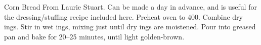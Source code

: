 \begin{recipe}{Corn Bread}{}{}
\freeform From Laurie Stuart.  Can be made a day in advance, and is useful for the dressing/stuffing recipe included here.
\newstep Preheat oven to 400\0.
Combine dry ings.
Stir in wet ings, mixing just until dry ings are moistened.  Pour into greased pan and bake for 20--25 minutes, until light golden-brown.
\end{recipe}
